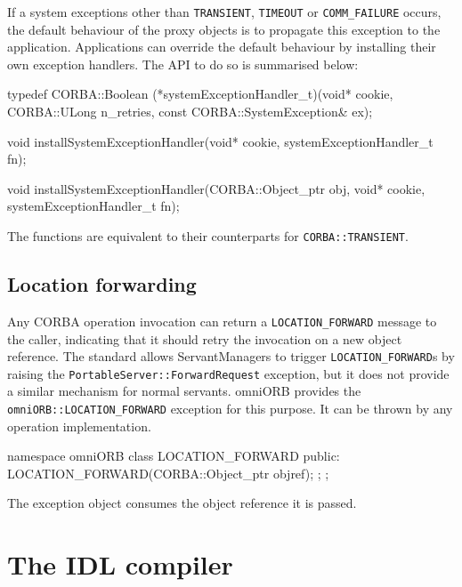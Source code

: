 \documentclass[11pt,twoside,a4paper]{book}
\newcommand{\code}[1]{\texttt{#1}}
\newcommand{\dsc}{\discretionary{}{}{}}
\begin{document}
If a system exceptions other than \code{TRANSIENT}, \code{TIMEOUT} or
\code{COMM\_FAILURE} occurs, the default behaviour of the proxy
objects is to propagate this exception to the application.
Applications can override the default behaviour by installing their
own exception handlers. The API to do so is summarised below:


\begin{cxxlisting}
typedef CORBA::Boolean
(*systemExceptionHandler_t)(void* cookie,
                            CORBA::ULong n_retries,
                            const CORBA::SystemException& ex);

void
installSystemExceptionHandler(void* cookie,
                              systemExceptionHandler_t fn);

void
installSystemExceptionHandler(CORBA::Object_ptr obj,
                              void* cookie,
                              systemExceptionHandler_t fn);
\end{cxxlisting}

The functions are equivalent to their counterparts for
\code{CORBA::TRANSIENT}.



\section{Location forwarding}
\label{sec:locationForward}

Any CORBA operation invocation can return a \code{LOCATION\_FORWARD}
message to the caller, indicating that it should retry the invocation
on a new object reference. The standard allows ServantManagers to
trigger \code{LOCATION\_FORWARD}s by raising the
\code{PortableServer::ForwardRequest} exception, but it does not
provide a similar mechanism for normal servants. omniORB provides the
\code{omniORB::\dsc{}LOCATION\_FORWARD} exception for this purpose. It
can be thrown by any operation implementation.

\begin{cxxlisting}
namespace omniORB {
  class LOCATION_FORWARD {
  public:
    LOCATION_FORWARD(CORBA::Object_ptr objref);
  };
};
\end{cxxlisting}

\noindent The exception object consumes the object reference it is
passed.





\chapter{The IDL compiler}
\label{chap:omniidl}
\end{document}

